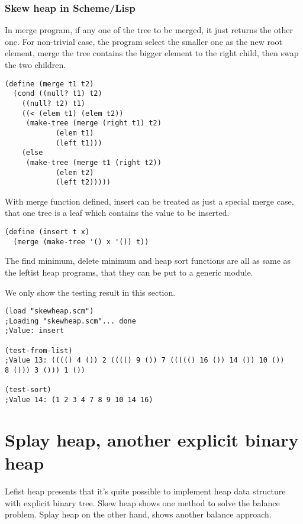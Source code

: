 \documentclass{article}
\begin{document}
\subsubsection*{Skew heap in Scheme/Lisp}

In merge program, if any one of the tree to be merged, it just returns the
other one. For non-trivial case, the program select the smaller one
as the new root element, merge the tree contains the bigger element
to the right child, then swap the two children.

\lstset{language = lisp}
\begin{lstlisting}
(define (merge t1 t2)
  (cond ((null? t1) t2)
	((null? t2) t1)
	((< (elem t1) (elem t2)) 
	 (make-tree (merge (right t1) t2) 
		    (elem t1)
		    (left t1)))
	(else 
	 (make-tree (merge t1 (right t2))
		    (elem t2)
		    (left t2)))))
\end{lstlisting}

With merge function defined, insert can be treated as just a special
merge case, that one tree is a leaf which contains the value to be
inserted.

\begin{lstlisting}
(define (insert t x)
  (merge (make-tree '() x '()) t))
\end{lstlisting}

The find minimum, delete minimum and heap sort functions are all
as same as the leftist heap programs, that they can be put to 
a generic module. 

We only show the testing result in this section.

\begin{lstlisting}
(load "skewheap.scm")
;Loading "skewheap.scm"... done
;Value: insert

(test-from-list)
;Value 13: (((() 4 ()) 2 (((() 9 ()) 7 ((((() 16 ()) 14 ()) 10 ()) 
8 ())) 3 ())) 1 ())

(test-sort)
;Value 14: (1 2 3 4 7 8 9 10 14 16)
\end{lstlisting}


\section{Splay heap, another explicit binary heap}
\label{splayheap}

Lefist heap presents that it's quite possible to implement
heap data structure with explicit binary tree. Skew heap
shows one method to solve the balance problem. Splay heap
on the other hand, shows another balance approach.
\end{document}

